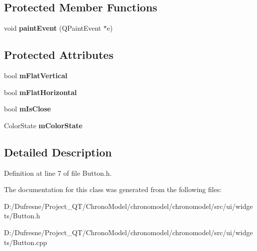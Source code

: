 \subsection*{Protected Member Functions}
\begin{DoxyCompactItemize}
\item 
\hypertarget{class_button_afbb8d7c148180c5c321c5140de56ba6d}{void {\bfseries paint\-Event} (Q\-Paint\-Event $\ast$e)}\label{class_button_afbb8d7c148180c5c321c5140de56ba6d}

\end{DoxyCompactItemize}
\subsection*{Protected Attributes}
\begin{DoxyCompactItemize}
\item 
\hypertarget{class_button_ab01e1d3f1c2c731e4f620110b2d8c10a}{bool {\bfseries m\-Flat\-Vertical}}\label{class_button_ab01e1d3f1c2c731e4f620110b2d8c10a}

\item 
\hypertarget{class_button_a419a6d33594d06de6616f8e96114d3a0}{bool {\bfseries m\-Flat\-Horizontal}}\label{class_button_a419a6d33594d06de6616f8e96114d3a0}

\item 
\hypertarget{class_button_af70edd97ae70077ae77d6fef9097c7a2}{bool {\bfseries m\-Is\-Close}}\label{class_button_af70edd97ae70077ae77d6fef9097c7a2}

\item 
\hypertarget{class_button_adcc571033f447b1b84b1db4af4d359c1}{Color\-State {\bfseries m\-Color\-State}}\label{class_button_adcc571033f447b1b84b1db4af4d359c1}

\end{DoxyCompactItemize}


\subsection{Detailed Description}


Definition at line 7 of file Button.\-h.



The documentation for this class was generated from the following files\-:\begin{DoxyCompactItemize}
\item 
D\-:/\-Dufresne/\-Project\-\_\-\-Q\-T/\-Chrono\-Model/chronomodel/chronomodel/src/ui/widgets/Button.\-h\item 
D\-:/\-Dufresne/\-Project\-\_\-\-Q\-T/\-Chrono\-Model/chronomodel/chronomodel/src/ui/widgets/Button.\-cpp\end{DoxyCompactItemize}
